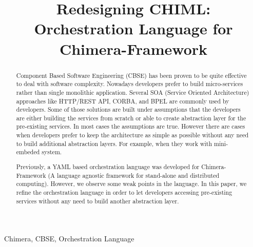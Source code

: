 \documentclass[conference]{IEEEtran}
\begin{document}

\title{Redesigning CHIML: Orchestration Language for Chimera-Framework}

\author{
\and
{}
\and
{}
}


\maketitle


\begin{abstract}
Component Based Software Engineering (CBSE) has been proven to be quite effective to deal with software complexity. Nowadays developers prefer to build micro-services rather than single monolithic application. Several SOA (Service Oriented Architecture) approaches like HTTP/REST API, CORBA, and BPEL are commonly used by developers. Some of those solutions are built under assumptions that the developers are either building the services from scratch or able to create abstraction layer for the pre-existing services. In most cases the assumptions are true. However there are cases when developers prefer to keep the architecture as simple as possible without any need to build additional abstraction layers. For example, when they work with mini-embeded system.

Previously, a YAML based orchestration language was developed for Chimera-Framework (A language agnostic framework for stand-alone and distributed computing). However, we observe some weak points in the language. In this paper, we refine the orchestration language in order to let developers accessing pre-existing services without any need to build another abstraction layer.
\end{abstract}

\begin{IEEEkeywords}
Chimera, CBSE, Orchestration Language
\end{IEEEkeywords}
\end{document}
